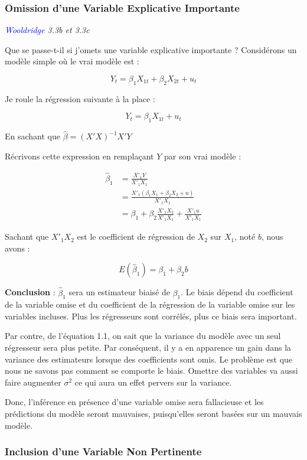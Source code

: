 \documentclass[14pt]{extarticle} %
\theoremstyle{definition}
\theoremstyle{plain}
\newcommand{\livre}[1]{\textcolor{blue}{#1}}
\begin{document}
\subsubsection{Omission d’une Variable Explicative Importante}

\textit{\livre{Wooldridge} 3.3b et 3.3c}

Que se passe-t-il si j’omets une variable explicative importante ? Considérons un modèle simple où le vrai modèle est :

\[
Y_t = \beta_1 X_{1t} + \beta_2 X_{2t} + u_t
\]

Je roule la régression suivante à la place :

\[
Y_t = \beta_1 X_{1t} + u_t
\]

En sachant que $\hat{\beta} = (X'X)^{-1}X'Y$

Récrivons cette expression en remplaçant $Y$ par son vrai modèle :

\begin{align*}
\hat{\beta}_1 &= \frac{X'_1 Y}{X'_1 X_1} \\
&= \frac{X'_1 (\beta_1 X_1 + \beta_2 X_2 + u)}{X'_1 X_1} \\
&= \beta_1 + \beta_2 \frac{X'_1 X_2}{X'_1 X_1} + \frac{X'_1 u}{X'_1 X_1}
\end{align*}

Sachant que $X'_1 X_2$ est le coefficient de régression de $X_2$ sur $X_1$, noté $b$, nous avons :

\[
E(\hat{\beta}_1) = \beta_1 + \beta_2 b
\]

\textbf{Conclusion} : $\hat{\beta}_1$ sera un estimateur biaisé de $\beta_1$. Le biais dépend du coefficient de la variable omise et du coefficient de la régression de la variable omise sur les variables incluses. Plus les régresseurs sont corrélés, plus ce biais sera important.

Par contre, de l'équation 1.1, on sait que la variance du modèle avec un seul régresseur sera plus petite. Par conséquent, il y a en apparence un gain dans la variance des estimateurs lorsque des coefficients sont omis. Le problème est que nous ne savons pas comment se comporte le biais. Omettre des variables va aussi faire augmenter $\sigma^2$ ce qui aura un effet pervers sur la variance.

Donc, l’inférence en présence d'une variable omise sera fallacieuse et les prédictions du modèle seront mauvaises, puisqu’elles seront basées sur un mauvais modèle.

\subsubsection{Inclusion d’une Variable Non Pertinente}
\end{document}
